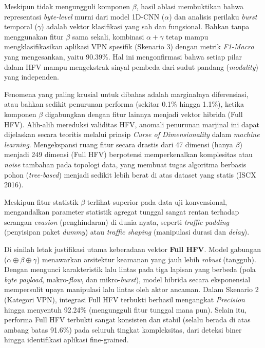 Meskipun tidak mengungguli komponen $\beta$, hasil ablasi membuktikan bahwa representasi \textit{byte-level} murni dari model 1D-CNN ($\alpha$) dan analisis perilaku \textit{burst} temporal ($\gamma$) adalah vektor klasifikasi yang sah dan fungsional. Bahkan tanpa menggunakan fitur $\beta$ sama sekali, kombinasi $\alpha + \gamma$ tetap mampu mengklasifikasikan aplikasi VPN spesifik (Skenario 3) dengan metrik \textit{F1-Macro} yang mengesankan, yaitu 90.39\%. Hal ini mengonfirmasi bahwa setiap pilar dalam HFV mampu mengekstrak sinyal pembeda dari sudut pandang (\textit{modality}) yang independen.

Fenomena yang paling krusial untuk dibahas adalah marginalnya diferensiasi, atau bahkan sedikit penurunan performa (sekitar 0.1\% hingga 1.1\%), ketika komponen $\beta$ digabungkan dengan fitur lainnya menjadi vektor hibrida (Full HFV). Alih-alih mereduksi validitas HFV, anomali penurunan marjinal ini dapat dijelaskan secara teoritis melalui prinsip \textit{Curse of Dimensionality} dalam \textit{machine learning}. Mengekspansi ruang fitur secara drastis dari 47 dimensi (hanya $\beta$) menjadi 249 dimensi (Full HFV) berpotensi memperkenalkan komplesitas atau \textit{noise} tambahan pada topologi data, yang membuat tugas algoritma berbasis pohon (\textit{tree-based}) menjadi sedikit lebih berat di atas dataset yang statis (ISCX 2016). 

Meskipun fitur statistik $\beta$ terlihat superior pada data uji konvensional, mengandalkan parameter statistik agregat tunggal sangat rentan terhadap serangan \textit{evasion} (penghindaran) di dunia nyata, seperti \textit{traffic padding} (penyisipan paket \textit{dummy}) atau \textit{traffic shaping} (manipulasi durasi dan \textit{delay}). 

Di sinilah letak justifikasi utama keberadaan vektor \textbf{Full HFV}. Model gabungan ($\alpha \oplus \beta \oplus \gamma$) menawarkan arsitektur keamanan yang jauh lebih \textit{robust} (tangguh). Dengan mengunci karakteristik lalu lintas pada tiga lapisan yang berbeda (pola \textit{byte payload}, makro-\textit{flow}, dan mikro-\textit{burst}), model hibrida secara eksponensial mempersulit upaya manipulasi lalu lintas oleh aktor ancaman. Dalam Skenario 2 (Kategori VPN), integrasi Full HFV terbukti berhasil mengangkat \textit{Precision} hingga menyentuh 92.24\% (mengungguli fitur tunggal mana pun). Selain itu, performa Full HFV terbukti sangat konsisten dan stabil (selalu berada di atas ambang batas 91.6\%) pada seluruh tingkat kompleksitas, dari deteksi biner hingga identifikasi aplikasi fine-grained.

